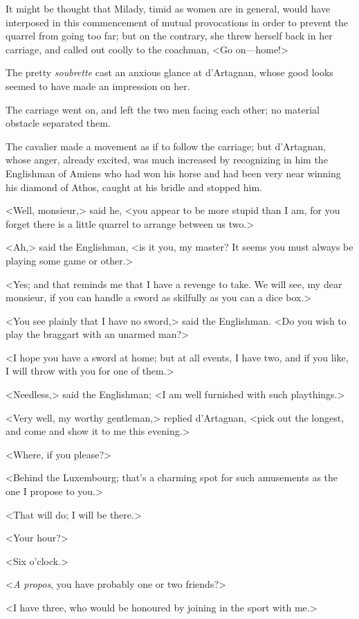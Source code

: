 It might be thought that Milady, timid as women are in general, would have interposed in this commencement of mutual provocations in order to prevent the quarrel from going too far; but on the contrary, she threw herself back in her carriage, and called out coolly to the coachman, <Go on---home!> 

The pretty \textit{soubrette} cast an anxious glance at d'Artagnan, whose good looks seemed to have made an impression on her. 

The carriage went on, and left the two men facing each other; no material obstacle separated them. 

The cavalier made a movement as if to follow the carriage; but d'Artagnan, whose anger, already excited, was much increased by recognizing in him the Englishman of Amiens who had won his horse and had been very near winning his diamond of Athos, caught at his bridle and stopped him. 

<Well, monsieur,> said he, <you appear to be more stupid than I am, for you forget there is a little quarrel to arrange between us two.> 

<Ah,> said the Englishman, <is it you, my master? It seems you must always be playing some game or other.> 

<Yes; and that reminds me that I have a revenge to take. We will see, my dear monsieur, if you can handle a sword as skilfully as you can a dice box.> 

<You see plainly that I have no sword,> said the Englishman. <Do you wish to play the braggart with an unarmed man?> 

<I hope you have a sword at home; but at all events, I have two, and if you like, I will throw with you for one of them.> 

<Needless,> said the Englishman; <I am well furnished with such playthings.> 

<Very well, my worthy gentleman,> replied d'Artagnan, <pick out the longest, and come and show it to me this evening.> 

<Where, if you please?> 

<Behind the Luxembourg; that's a charming spot for such amusements as the one I propose to you.> 

<That will do; I will be there.> 

<Your hour?> 

<Six o'clock.> 

<\textit{A propos}, you have probably one or two friends?> 

<I have three, who would be honoured by joining in the sport with me.> 

